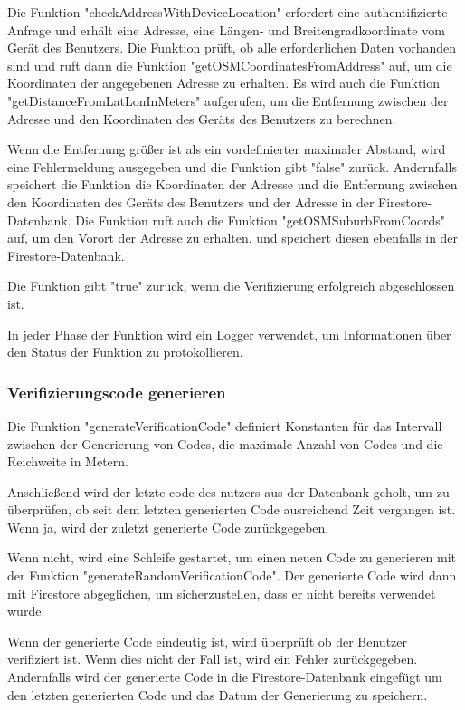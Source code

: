 Die Funktion "checkAddressWithDeviceLocation" erfordert eine authentifizierte Anfrage und
erhält eine Adresse, eine Längen- und Breitengradkoordinate
vom Gerät des Benutzers. Die Funktion prüft, ob alle
erforderlichen Daten vorhanden sind und ruft dann die
Funktion "getOSMCoordinatesFromAddress" auf, um die
Koordinaten der angegebenen Adresse zu erhalten. Es wird
auch die Funktion "getDistanceFromLatLonInMeters"
aufgerufen, um die Entfernung zwischen der Adresse und den
Koordinaten des Geräts des Benutzers zu berechnen.

Wenn die Entfernung größer ist als ein vordefinierter maximaler Abstand, wird eine Fehlermeldung ausgegeben und die Funktion gibt "false" zurück. Andernfalls speichert die Funktion die Koordinaten der Adresse und die Entfernung zwischen den Koordinaten des Geräts des Benutzers und der Adresse in der Firestore-Datenbank. Die Funktion ruft auch die Funktion "getOSMSuburbFromCoords" auf, um den Vorort der Adresse zu erhalten, und speichert diesen ebenfalls in der Firestore-Datenbank.

Die Funktion gibt "true" zurück, wenn die Verifizierung
erfolgreich abgeschlossen ist.

In jeder Phase der Funktion wird ein Logger verwendet, um Informationen über den Status der Funktion zu protokollieren.

\subsubsection{Verifizierungscode generieren}
\author{Martin Hausleitner}
Die Funktion "generateVerificationCode" definiert Konstanten
für das Intervall zwischen der Generierung von Codes, die
maximale Anzahl von Codes und die Reichweite in Metern.

Anschließend wird der letzte code des nutzers aus der
Datenbank geholt, um zu überprüfen, ob seit dem
letzten generierten Code ausreichend Zeit vergangen ist.
Wenn ja, wird der zuletzt generierte Code zurückgegeben.

Wenn nicht, wird eine Schleife gestartet, um einen neuen
Code zu generieren mit der Funktion "generateRandomVerificationCode". Der generierte Code wird dann mit
Firestore abgeglichen, um sicherzustellen, dass er nicht
bereits verwendet wurde.

Wenn der generierte Code eindeutig ist, wird überprüft ob
der Benutzer verifiziert ist. Wenn dies nicht der Fall ist,
wird ein Fehler zurückgegeben. Andernfalls wird der
generierte Code in die
Firestore-Datenbank eingefügt um den letzten generierten
Code und das Datum der Generierung zu speichern.

